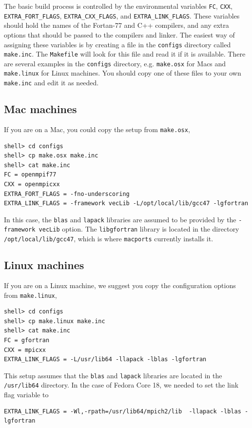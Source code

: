 \documentclass[11pt]{report}
\begin{document}
The basic build process is controlled by the environmental variables \verb+FC+, \verb+CXX+,
\verb+EXTRA_FORT_FLAGS+, \verb+EXTRA_CXX_FLAGS+, and \verb+EXTRA_LINK_FLAGS+. These variables should
hold the names of the Fortan-77 and C++ compilers, and any extra options that should be passed to
the compilers and linker. The easiest way of assigning these variables is by creating a file in the
\verb+configs+ directory called \verb+make.inc+. The \verb+Makefile+ will look for this file and
read it if it is available. There are several examples in the \verb+configs+ directory, e.g.
\verb+make.osx+ for Macs and \verb+make.linux+ for Linux machines. You should copy one of these files
to your own \verb+make.inc+ and edit it as needed. 

\subsection{Mac machines}
If you are on a Mac, you could copy the setup from \verb+make.osx+,
\begin{verbatim}
shell> cd configs
shell> cp make.osx make.inc
shell> cat make.inc
FC = openmpif77
CXX = openmpicxx
EXTRA_FORT_FLAGS = -fno-underscoring
EXTRA_LINK_FLAGS = -framework vecLib -L/opt/local/lib/gcc47 -lgfortran
\end{verbatim}
In this case, the \verb+blas+ and \verb+lapack+ libraries are assumed to be provided by the
\verb+-framework vecLib+ option. The \verb+libgfortran+ library is located in the directory
\verb+/opt/local/lib/gcc47+, which is where \verb+macports+ currently installs it.

\subsection{Linux machines}
If you are on a Linux machine, we suggest you copy the configuration options from \verb+make.linux+,
\begin{verbatim}
shell> cd configs
shell> cp make.linux make.inc
shell> cat make.inc
FC = gfortran
CXX = mpicxx
EXTRA_LINK_FLAGS = -L/usr/lib64 -llapack -lblas -lgfortran
\end{verbatim}
This setup assumes that the \verb+blas+ and \verb+lapack+ libraries are located in the
\verb+/usr/lib64+ directory. 
In the case of Fedora Core 18, we needed to set the link flag variable to
\begin{verbatim}
EXTRA_LINK_FLAGS = -Wl,-rpath=/usr/lib64/mpich2/lib  -llapack -lblas -lgfortran
\end{verbatim}
\end{document}
